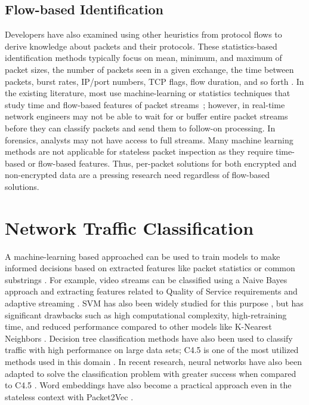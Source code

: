 \subsection{Flow-based Identification}
Developers have also examined using other heuristics from protocol flows to derive knowledge about packets and their protocols. These statistics-based identification methods typically focus on mean, minimum, and maximum of packet sizes, the number of packets seen in a given exchange, the time between packets, burst rates, IP/port numbers, TCP flags, flow duration, and so forth \cite{Moore2013DiscriminatorsFU, ZHAO202122, Paxson}. In the existing literature, most use machine-learning or statistics techniques that study time and flow-based features of packet streams~\cite{Salman, Cao, Lim, LiZ, Song2019, iscx-vpn-paper, iscx-tor-paper}; however, in real-time network engineers may not be able to wait for or buffer entire packet streams before they can classify packets and send them to follow-on processing. In forensics, analysts may not have access to full streams. Many machine learning methods are not applicable for stateless packet inspection as they require time-based or flow-based features. Thus, per-packet solutions for both encrypted and non-encrypted data are a pressing research need regardless of flow-based solutions.

\section{Network Traffic Classification}
A machine-learning based approached can be used to train models to make informed decisions based on extracted features like packet statistics or common substrings \cite{sigbox}. For example, video streams can be classified using a Naive Bayes approach and extracting features related to Quality of Service requirements and adaptive streaming \cite{DIAS2019143}. SVM has also been widely studied for this purpose \cite{LiZ, Cao}, but has significant drawbacks such as high computational complexity, high-retraining time, and reduced performance compared to other models like K-Nearest Neighbors \cite{Salman}. Decision tree classification methods have also been used to classify traffic with high performance on large data sets; C4.5 is one of the most utilized methods used in this domain \cite{Yuan, iscx-vpn-paper}. In recent research, neural networks have also been adapted to solve the classification problem with greater success when compared to C4.5 \cite{deeppacket}. Word embeddings have also become a practical approach even in the stateless context with Packet2Vec \cite{packet2vec}.

